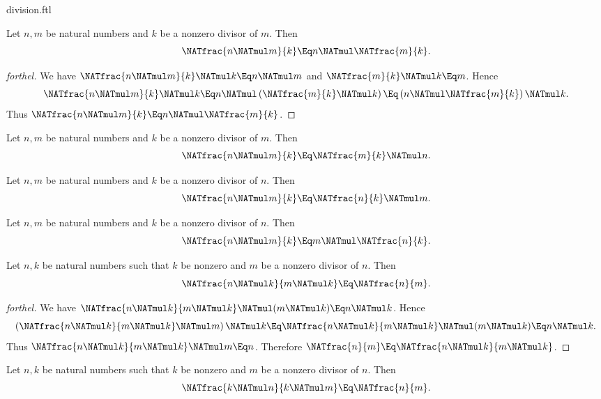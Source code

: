 \documentclass{stex}
\begin{document}
\begin{smodule}{division.ftl}
\begin{proposition}[forthel]
  Let $n, m$ be natural numbers and $k$ be a nonzero divisor of $m$.
  Then \[\NATfrac{n \NATmul m}{k} \Eq n \NATmul \NATfrac{m}{k}.\]
\end{proposition}
\begin{proof}[forthel]
  We have $\NATfrac{n \NATmul m}{k} \NATmul k \Eq n \NATmul m$ and $\NATfrac{m}{k} \NATmul k \Eq m$.
  Hence
  \[  \NATfrac{n \NATmul m}{k} \NATmul k
      \Eq n \NATmul \left( \NATfrac{m}{k} \NATmul k \right)
      \Eq \left( n \NATmul \NATfrac{m}{k} \right) \NATmul k. \]
  Thus $\NATfrac{n \NATmul m}{k} \Eq n \NATmul \NATfrac{m}{k}$.
\end{proof}

\begin{corollary}[forthel]
  Let $n, m$ be natural numbers and $k$ be a nonzero divisor of $m$.
  Then \[\NATfrac{n \NATmul m}{k} \Eq \NATfrac{m}{k} \NATmul n.\]
\end{corollary}

\begin{corollary}[forthel]
  Let $n, m$ be natural numbers and $k$ be a nonzero divisor of $n$.
  Then \[\NATfrac{n \NATmul m}{k} \Eq \NATfrac{n}{k} \NATmul m.\]
\end{corollary}

\begin{corollary}[forthel]
  Let $n, m$ be natural numbers and $k$ be a nonzero divisor of $n$.
  Then \[\NATfrac{n \NATmul m}{k} \Eq m \NATmul \NATfrac{n}{k}.\]
\end{corollary}

\begin{proposition}[forthel]
  Let $n, k$ be natural numbers such that $k$ be nonzero and $m$ be a nonzero divisor of $n$.
  Then \[\NATfrac{n \NATmul k}{m \NATmul k} \Eq \NATfrac{n}{m}.\]
\end{proposition}
\begin{proof}[forthel]
  We have $\NATfrac{n \NATmul k}{m \NATmul k} \NATmul (m \NATmul k) \Eq n \NATmul k$.
  Hence
  \[  \left( \NATfrac{n \NATmul k}{m \NATmul k} \NATmul m \right) \NATmul k
      \Eq \NATfrac{n \NATmul k}{m \NATmul k} \NATmul (m \NATmul k)
      \Eq n \NATmul k. \]
  Thus $\NATfrac{n \NATmul k}{m \NATmul k} \NATmul m \Eq n$.
  Therefore $\NATfrac{n}{m} \Eq \NATfrac{n \NATmul k}{m \NATmul k}$.
\end{proof}

\begin{corollary}[forthel]
  Let $n, k$ be natural numbers such that $k$ be nonzero and $m$ be a nonzero divisor of $n$.
  Then \[\NATfrac{k \NATmul n}{k \NATmul m} \Eq \NATfrac{n}{m}.\]
\end{corollary}
\end{smodule}
\end{document}
